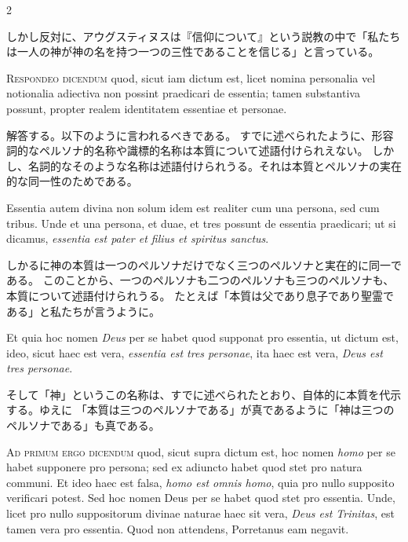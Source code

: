 \documentclass[paper=a4paper,fontsize=10pt,jafontsize=9pt,titlepage]{jlreq}
\begin{document}
\begin{paracol}{2}
\switchcolumn

しかし反対に、アウグスティヌスは『信仰について』という説教の中で「私たちは一人の神が神の名を持つ一つの三性であることを信じる」と言っている。

\switchcolumn*

\textsc{Respondeo dicendum} quod, sicut iam dictum est, licet nomina personalia vel
notionalia adiectiva non possint praedicari de essentia; tamen substantiva
possunt, propter realem identitatem essentiae et personae.

\switchcolumn

解答する。以下のように言われるべきである。
すでに述べられたように、形容詞的なペルソナ的名称や識標的名称は本質について述語付けられえない。
しかし、名詞的なそのような名称は述語付けられうる。それは本質とペルソナの実在的な同一性のためである。

\switchcolumn*

Essentia autem
divina non solum idem est realiter cum una persona, sed cum tribus. Unde et una
persona, et duae, et tres possunt de essentia praedicari; ut si dicamus,
\textit{essentia est pater et filius et spiritus sanctus}.

\switchcolumn

しかるに神の本質は一つのペルソナだけでなく三つのペルソナと実在的に同一である。
このことから、一つのペルソナも二つのペルソナも三つのペルソナも、本質について述語付けられうる。
たとえば「本質は父であり息子であり聖霊である」と私たちが言うように。

\switchcolumn*

Et quia hoc nomen \textit{Deus} per se
habet quod supponat pro essentia, ut dictum est, ideo, sicut haec est vera,
\textit{essentia est tres personae}, ita haec est vera, \textit{Deus est tres personae}.

\switchcolumn

そして「神」というこの名称は、すでに述べられたとおり、自体的に本質を代示する。ゆえに
「本質は三つのペルソナである」が真であるように「神は三つのペルソナである」も真である。

\switchcolumn*

\textsc{Ad primum ergo dicendum} quod, sicut supra dictum est, hoc nomen \textit{homo} per se
habet supponere pro persona; sed ex adiuncto habet quod stet pro natura
communi. Et ideo haec est falsa, \textit{homo est omnis homo}, quia pro nullo supposito
verificari potest. Sed hoc nomen Deus per se habet quod stet pro essentia.
Unde, licet pro nullo suppositorum divinae naturae haec sit vera, \textit{Deus est
Trinitas}, est tamen vera pro essentia. Quod non attendens, Porretanus eam
negavit.


\end{paracol}
\end{document}
